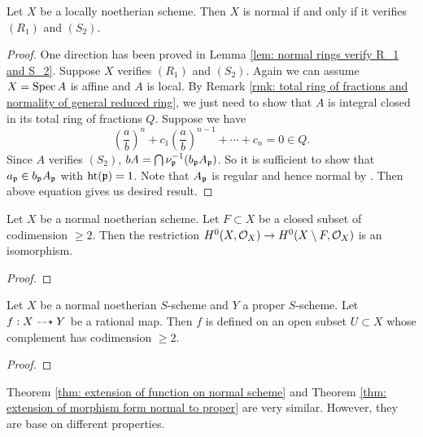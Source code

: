     \begin{theorem}
        Let $X$ be a locally noetherian scheme.
        Then $X$ is normal if and only if it verifies $(R_1)$ and $(S_2)$.
    \end{theorem}
    \begin{proof}
        One direction has been proved in Lemma \ref{lem: normal rings verify R_1 and S_2}.
        Suppose $X$ verifies $(R_1)$ and $(S_2)$.
        Again we can assume $X = \operatorname{Spec} A$ is affine and $A$ is local.
        By Remark \ref{rmk: total ring of fractions and normality of general reduced ring}, we just need to show that $A$ is integral closed in its total ring of fractions $Q$.
        Suppose we have 
        \[ \left(\frac{a}{b}\right)^n + c_1 \left(\frac{a}{b}\right)^{n-1} + \cdots + c_n = 0 \in Q. \]
        Since $A$ verifies $(S_2)$, $b A = \bigcap \nu_{\mathfrak{p}}^{-1}(b_{\mathfrak{p}} A_{\mathfrak{p}})$.
        So it is sufficient to show that $a_{{\mathfrak{p}}} \in b_{\mathfrak{p}} A_{\mathfrak{p}}$ with $\operatorname{ht}({\mathfrak{p}}) = 1$.
        Note that $A_{\mathfrak{p}}$ is regular and hence normal by .
        Then above equation gives us desired result.
    \end{proof}

    \begin{theorem}\label{thm: extension of function on normal scheme}
        Let $X$ be a normal noetherian scheme.
        Let $F \subset X$ be a closed subset of codimension $\geq 2$.
        Then the restriction $H^0(X,{\mathcal{O}}_X) \to H^0(X\setminus F, {\mathcal{O}}_{X})$ is an isomorphism.
    \end{theorem}
    \begin{proof}
    \end{proof}

    \begin{theorem}\label{thm: extension of morphism form normal to proper}
        Let $X$ be a normal noetherian $S$-scheme and $Y$ a proper $S$-scheme.
        Let $f:X \dasharrow Y$ be a rational map.
        Then $f$ is defined on an open subset $U \subset X$ whose complement has codimension $\geq 2$.
    \end{theorem}
    \begin{proof}
    \end{proof}

    \begin{remark}
        Theorem \ref{thm: extension of function on normal scheme} and Theorem \ref{thm: extension of morphism form normal to proper} are very similar.
        However, they are base on different properties.
    \end{remark}




